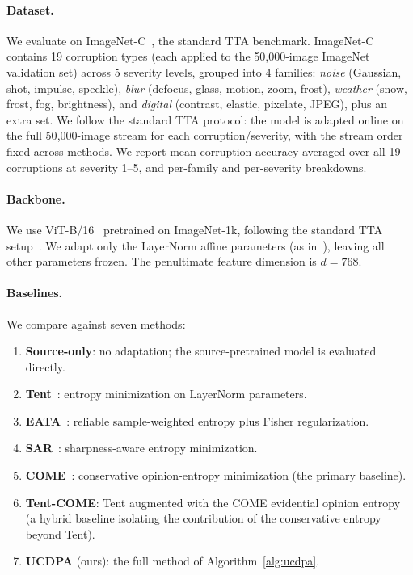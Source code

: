\paragraph{Dataset.}
We evaluate on ImageNet-C~\citep{hendrycks2019robustness}, the standard TTA benchmark. ImageNet-C contains 19 corruption types (each applied to the 50{,}000-image ImageNet validation set) across 5 severity levels, grouped into 4 families: \emph{noise} (Gaussian, shot, impulse, speckle), \emph{blur} (defocus, glass, motion, zoom, frost), \emph{weather} (snow, frost, fog, brightness), and \emph{digital} (contrast, elastic, pixelate, JPEG), plus an extra set. We follow the standard TTA protocol: the model is adapted online on the full 50{,}000-image stream for each corruption/severity, with the stream order fixed across methods. We report mean corruption accuracy averaged over all 19 corruptions at severity 1--5, and per-family and per-severity breakdowns.

\paragraph{Backbone.}
We use ViT-B/16~\citep{dosovitskiy2021vit} pretrained on ImageNet-1k, following the standard TTA setup~\citep{niu2023sar,come2024come}. We adapt only the LayerNorm affine parameters (as in~\citep{niu2023sar,come2024come}), leaving all other parameters frozen. The penultimate feature dimension is $d=768$.

\paragraph{Baselines.}
We compare against seven methods:
\begin{enumerate}[leftmargin=*,topsep=2pt,itemsep=2pt]
  \item \textbf{Source-only}: no adaptation; the source-pretrained model is evaluated directly.
  \item \textbf{Tent}~\citep{wang2021tent}: entropy minimization on LayerNorm parameters.
  \item \textbf{EATA}~\citep{niu2022eata}: reliable sample-weighted entropy plus Fisher regularization.
  \item \textbf{SAR}~\citep{niu2023sar}: sharpness-aware entropy minimization.
  \item \textbf{COME}~\citep{come2024come}: conservative opinion-entropy minimization (the primary baseline).
  \item \textbf{Tent-COME}: Tent augmented with the COME evidential opinion entropy (a hybrid baseline isolating the contribution of the conservative entropy beyond Tent).
  \item \textbf{UCDPA} (ours): the full method of Algorithm~\ref{alg:ucdpa}.
\end{enumerate}

